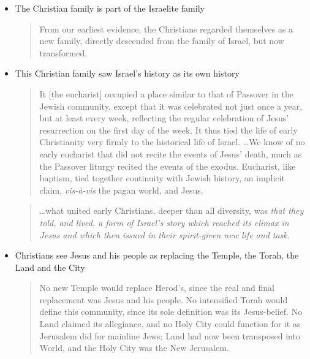 \begin{itemize}
    \item The Christian family is part of the Israelite family

        \begin{quote}
            From our earliest evidence, the Christians regarded themselves as a
            new family, directly descended from the family of Israel, but now
            transformed.
            \autocite[447]{wright:1992}
        \end{quote}

    \item This Christian family saw Israel's history as its own history

        \begin{quote}
            It [the eucharist] occupied a place similar to that of Passover in
            the Jewish community, except that it was celebrated not just once a
            year, but at least every week, reflecting the regular celebration of
            Jesus' resurrection on the first day of the week. It thus tied the
            life of early Christianity very firmly to the historical life of
            Israel. \dots We know of no early eucharist that did not recite the
            events of Jesus' death, much as the Passover liturgy recited the
            events of the exodus. Eucharist, like baptism, tied together
            continuity with Jewish history, an implicit claim,
            \textit{vis-\`{a}-vis} the pagan world, and Jesus.
            \autocite[448]{wright:1992}
        \end{quote}

        \begin{quote}
            \dots what united early Christians, deeper than all diversity, was
            \textit{that they told, and lived, a form of Israel's story which
            reached its climax in Jesus and which then issued in their
            spirit-given new life and task.}
            \autocite[][456, emphasis original]{wright:1992}
        \end{quote}

    \item Christians see Jesus and his people as replacing the Temple, the
        Torah, the Land and the City

        \begin{quote}
            No new Temple would replace Herod's, since the real and final
            replacement was Jesus and his people. No intensified Torah would
            define this community, since its sole definition was its
            Jesus-belief. No Land claimed its allegiance, and no Holy City could
            function for it as Jerusalem did for mainline Jews; Land had now
            been transposed into World, and the Holy City was the New Jerusalem.
            \autocite[451]{wright:1992}
        \end{quote}


\end{itemize}
